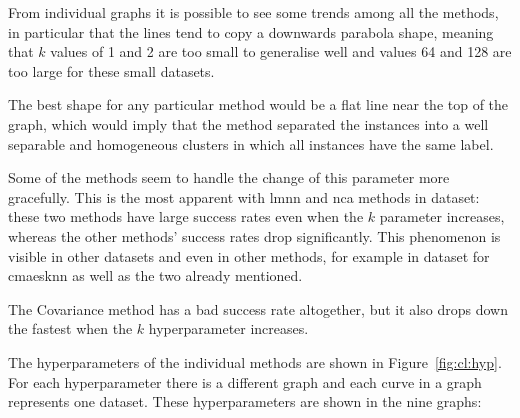From individual graphs it is possible to see some trends among all the methods, in particular that the lines tend to copy a downwards parabola shape, meaning that $k$ values of 1 and 2 are too small to generalise well and values 64 and 128 are too large for these small datasets.

The best shape for any particular method would be a flat line near the top of the graph, which would imply that the method separated the instances into a well separable and homogeneous clusters in which all instances have the same label.

Some of the methods seem to handle the change of this parameter more gracefully. This is the most apparent with \ac{lmnn} and \ac{nca} methods in  dataset: these two methods have large success rates even when the $k$ parameter increases, whereas the other methods' success rates drop significantly. This phenomenon is visible in other datasets and even in other methods, for example in  dataset for \ac{cmaesknn} as well as the two already mentioned.

The Covariance method has a bad success rate altogether, but it also drops down the fastest when the $k$ hyperparameter increases.


\clearpage

The hyperparameters of the individual methods are shown in Figure~\ref{fig:cl:hyp}. For each hyperparameter there is a different graph and each curve in a graph represents one dataset. These hyperparameters are shown in the nine graphs:


